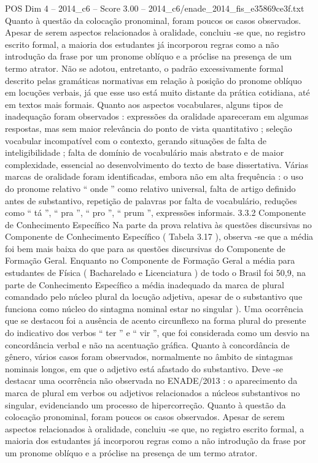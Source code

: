 \begin{textsample}{POS Dim 4 – 2014\_c6 – Score 3.00 – 2014\_c6/enade\_2014\_fis\_e35869ce3f.txt}
Quanto à questão da colocação pronominal, foram poucos os casos observados.
Apesar de serem aspectos relacionados à oralidade, concluiu -se que, no registro escrito formal, a maioria dos estudantes já incorporou regras como a não introdução da frase por um pronome oblíquo e a próclise na presença de um termo atrator.
Não se adotou, entretanto, o padrão excessivamente formal descrito pelas gramáticas normativas em relação à posição do pronome oblíquo em locuções verbais, já que esse uso está muito distante da prática cotidiana, até em textos mais formais.
Quanto aos aspectos vocabulares, alguns tipos de inadequação foram observados : expressões da oralidade apareceram em algumas respostas, mas sem maior relevância do ponto de vista quantitativo ; seleção vocabular incompatível com o contexto, gerando situações de falta de inteligibilidade ; falta de domínio de vocabulário mais abstrato e de maior complexidade, essencial ao desenvolvimento do texto de base dissertativa.
Várias marcas de oralidade foram identificadas, embora não em alta frequência : o uso do pronome relativo “ onde ” como relativo universal, falta de artigo definido antes de substantivo, repetição de palavras por falta de vocabulário, reduções como “ tá ”, “ pra ”, “ pro ”, “ prum ”, expressões informais. 3.3.2 Componente de Conhecimento Específico Na parte da prova relativa às questões discursivas no Componente de Conhecimento Específico ( Tabela 3.17 ), observa -se que a média foi bem mais baixa do que para as questões discursivas do Componente de Formação Geral.
Enquanto no Componente de Formação Geral a média para estudantes de Física ( Bacharelado e Licenciatura ) de todo o Brasil foi 50,9, na parte de Conhecimento Específico a média inadequado da marca de plural comandado pelo núcleo plural da locução adjetiva, apesar de o substantivo que funciona como núcleo do sintagma nominal estar no singular ).
Uma ocorrência que se destacou foi a ausência de acento circunflexo na forma plural do presente do indicativo dos verbos “ ter ” e “ vir ”, que foi considerada como um desvio na concordância verbal e não na acentuação gráfica.
Quanto à concordância de gênero, vários casos foram observados, normalmente no âmbito de sintagmas nominais longos, em que o adjetivo está afastado do substantivo.
Deve -se destacar uma ocorrência não observada no ENADE/2013 : o aparecimento da marca de plural em verbos ou adjetivos relacionados a núcleos substantivos no singular, evidenciando um processo de hipercorreção.
Quanto à questão da colocação pronominal, foram poucos os casos observados.
Apesar de serem aspectos relacionados à oralidade, concluiu -se que, no registro escrito formal, a maioria dos estudantes já incorporou regras como a não introdução da frase por um pronome oblíquo e a próclise na presença de um termo atrator.

\end{textsample}
